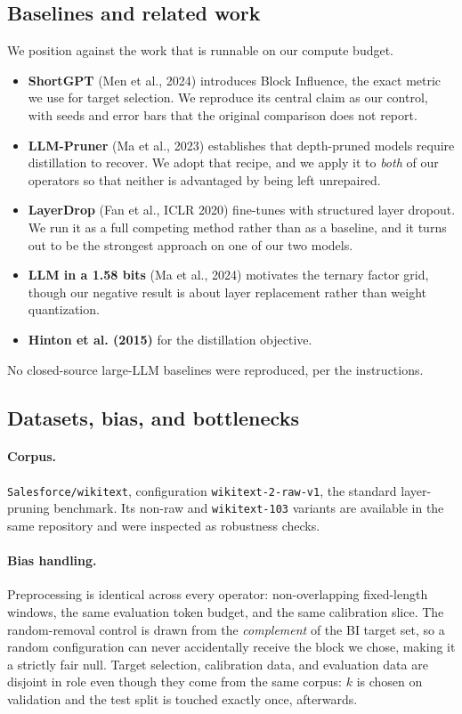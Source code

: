 \documentclass[11pt]{article}
\begin{document}
\subsection{Baselines and related work}
We position against the work that is runnable on our compute budget.
\begin{itemize}
\item \textbf{ShortGPT} (Men et al., 2024) introduces Block Influence, the
exact metric we use for target selection. We reproduce its central claim as
our control, with seeds and error bars that the original comparison does not
report.
\item \textbf{LLM-Pruner} (Ma et al., 2023) establishes that depth-pruned
models require distillation to recover. We adopt that recipe, and we apply it
to \emph{both} of our operators so that neither is advantaged by being left
unrepaired.
\item \textbf{LayerDrop} (Fan et al., ICLR 2020) fine-tunes with structured
layer dropout. We run it as a full competing method rather than as a
baseline, and it turns out to be the strongest approach on one of our two
models.
\item \textbf{LLM in a 1.58 bits} (Ma et al., 2024) motivates the ternary
factor grid, though our negative result is about layer replacement rather than
weight quantization.
\item \textbf{Hinton et al. (2015)} for the distillation objective.
\end{itemize}
No closed-source large-LLM baselines were reproduced, per the instructions.

\subsection{Datasets, bias, and bottlenecks}
\paragraph{Corpus.} \texttt{Salesforce/wikitext}, configuration
\texttt{wikitext-2-raw-v1}, the standard layer-pruning benchmark. Its
non-raw and \texttt{wikitext-103} variants are available in the same
repository and were inspected as robustness checks.
\paragraph{Bias handling.} Preprocessing is identical across every operator:
non-overlapping fixed-length windows, the same evaluation token budget, and the
same calibration slice. The random-removal control is drawn from the
\emph{complement} of the BI target set, so a random configuration can never
accidentally receive the block we chose, making it a strictly fair null.
Target selection, calibration data, and evaluation data are disjoint in role
even though they come from the same corpus: $k$ is chosen on validation and
the test split is touched exactly once, afterwards.
\end{document}
